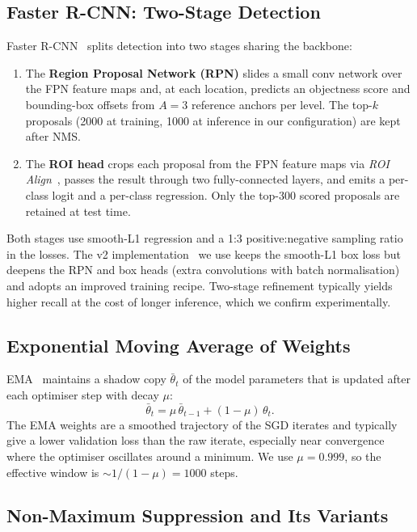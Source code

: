 \documentclass[11pt,a4paper]{article}
\begin{document}
\subsection{Faster R-CNN: Two-Stage Detection}

Faster R-CNN~\cite{ren2015faster} splits detection into two stages sharing the backbone:
\begin{enumerate}[nosep]
    \item The \textbf{Region Proposal Network (RPN)} slides a small conv network over the FPN feature maps and, at each location, predicts an objectness score and bounding-box offsets from $A = 3$ reference anchors per level. The top-$k$ proposals (2000 at training, 1000 at inference in our configuration) are kept after NMS.
    \item The \textbf{ROI head} crops each proposal from the FPN feature maps via \emph{ROI Align}~\cite{he2017maskrcnn}, passes the result through two fully-connected layers, and emits a per-class logit and a per-class regression. Only the top-300 scored proposals are retained at test time.
\end{enumerate}
Both stages use smooth-L1 regression and a 1:3 positive:negative sampling ratio in the losses. The v2 implementation~\cite{li2021benchmarking} we use keeps the smooth-L1 box loss but deepens the RPN and box heads (extra convolutions with batch normalisation) and adopts an improved training recipe. Two-stage refinement typically yields higher recall at the cost of longer inference, which we confirm experimentally.

\pagebreak

\subsection{Exponential Moving Average of Weights}

EMA~\cite{polyak1992averaging, tarvainen2017mean} maintains a shadow copy $\bar\theta_t$ of the model parameters that is updated after each optimiser step with decay $\mu$:
\begin{equation}
    \bar\theta_t = \mu \,\bar\theta_{t-1} + (1 - \mu)\,\theta_t.
\end{equation}
The EMA weights are a smoothed trajectory of the SGD iterates and typically give a lower validation loss than the raw iterate, especially near convergence where the optimiser oscillates around a minimum. We use $\mu = 0.999$, so the effective window is $\sim 1/(1-\mu) = 1000$ steps.

\subsection{Non-Maximum Suppression and Its Variants}
\end{document}
